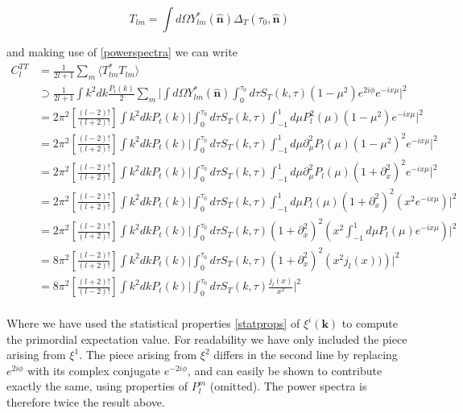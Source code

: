 \documentclass[a4paper,10pt]{article}
\renewcommand{\v}[1]{\mathbf{#1}}
\newcommand{\unit}[1]{\hat{\v{#1}}}
\newcommand{\ltwo}{\left[\frac{(l+2)!}{(l-2)!}\right]}
\newcommand{\ltwof}{\left[\frac{(l-2)!}{(l+2)!}\right]}
\begin{document}
\begin{equation}
T_{lm} = \int d\Omega Y_{lm}^*(\unit{n})\Delta_T(\tau_0,\unit{n})
\end{equation}

and making use of \ref{powerspectra} we can write 
\begin{equation}\begin{split}
C_l^{TT} &= \frac{1}{2l+1}\sum_m \langle T_{lm}^*T_{lm} \rangle \\
&\supset \frac{1}{2l+1} \int k^2 dk \frac{P_t(k)}{2} \sum_m \bigg| \int d\Omega Y^*_{lm}(\unit{n}) \int_0^{\tau_0} d\tau  S_T(k,\tau)(1-\mu^2)e^{2i\phi}e^{-ix\mu} \bigg|^2\\
&= 2\pi^2\ltwof \int k^2 dk P_t(k) \bigg|  \int_0^{\tau_0} d\tau  S_T(k,\tau)\int_{-1}^1 d\mu P_l^2(\mu)(1-\mu^2)e^{-ix\mu} \bigg|^2\\
&= 2\pi^2\ltwof \int k^2 dk P_t(k) \bigg|  \int_0^{\tau_0} d\tau  S_T(k,\tau)\int_{-1}^1 d\mu \partial_\mu^2P_l(\mu)(1-\mu^2)^2e^{-ix\mu}\bigg|^2\\
&= 2\pi^2\ltwof \int k^2 dk P_t(k) \bigg|  \int_0^{\tau_0} d\tau  S_T(k,\tau)\int_{-1}^1 d\mu \partial_\mu^2P_l(\mu)(1+\partial_x^2)^2e^{-ix\mu} \bigg|^2\\
&= 2\pi^2\ltwof \int k^2 dk P_t(k) \bigg|  \int_0^{\tau_0} d\tau  S_T(k,\tau)\int_{-1}^1 d\mu P_l(\mu)(1+\partial_x^2)^2(x^2e^{-ix\mu}) \bigg|^2\\
&= 2\pi^2\ltwof \int k^2 dk P_t(k) \bigg|  \int_0^{\tau_0} d\tau  S_T(k,\tau)(1+\partial_x^2)^2\left(x^2 \int_{-1}^1 d\mu P_l(\mu)e^{-ix\mu} \right)\bigg|^2\\
&= 8\pi^2\ltwof \int k^2 dk P_t(k) \bigg|  \int_0^{\tau_0} d\tau  S_T(k,\tau) (1+\partial_x^2)^2\left(x^2j_l(x)) \right)\bigg|^2\\
&= 8\pi^2\ltwo \int k^2 dk P_t(k) \bigg|  \int_0^{\tau_0} d\tau  S_T(k,\tau)\frac{j_l(x)}{x^2} \bigg|^2\\
\end{split}\end{equation}

Where we have used the statistical properties \ref{statprops} of $\xi^i(\v{k})$ to compute the primordial expectation value. For readability we have only included the piece arising from $\xi^1$. The piece arising from $\xi^2$ differs in the second line by replacing $e^{2i\phi}$ with its complex conjugate $e^{-2i\phi}$, and can easily be shown to contribute exactly the same, using properties of $P_l^m$ (omitted). The power spectra is therefore twice the result above.\\
\end{document}
